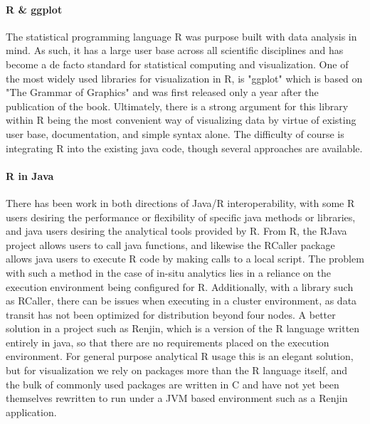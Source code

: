 \paragraph{R \& ggplot}
The statistical programming language R was purpose built with data analysis in mind. As such, it has a large user base across all scientific disciplines and has become a de facto standard for statistical computing and visualization. One of the most widely used libraries for visualization in R, is "ggplot" \cite{Wickham2006} which is based on "The Grammar of Graphics" and was first released only a year after the publication of the book. Ultimately, there is a strong argument for this library within R being the most convenient way of visualizing data by virtue of existing user base, documentation, and simple syntax alone. The difficulty of course is integrating R into the existing java code, though several approaches are available. 

\paragraph{R in Java}
There has been work in both directions of Java/R interoperability, with some R users desiring the performance or flexibility of specific java methods or libraries, and java users desiring the analytical tools provided by R. From R, the RJava project allows users to call java functions, and likewise the RCaller package allows java users to execute R code by making calls to a local script. The problem with such a method in the case of in-situ analytics lies in a reliance on the execution environment being configured for R. Additionally, with a library such as RCaller, there can be issues when executing in a cluster environment, as data transit has not been optimized for distribution beyond four nodes. A better solution in a project such as Renjin, which is a version of the R language written entirely in java, so that there are no requirements placed on the execution environment. For general purpose analytical R usage this is an elegant solution, but for visualization we rely on packages more than the R language itself, and the bulk of commonly used packages are written in C and have not yet been themselves rewritten to run under a JVM based environment such as a Renjin application.

